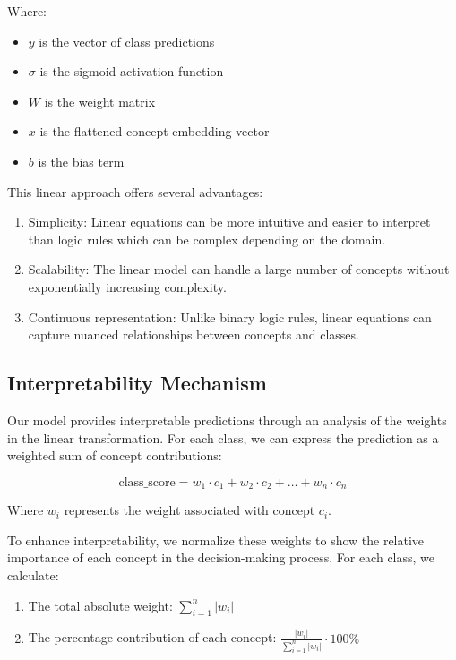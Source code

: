 \documentclass[sigconf, nonacm]{acmart}
\begin{document}
Where:
\begin{itemize}
    \item $y$ is the vector of class predictions
    \item $\sigma$ is the sigmoid activation function
    \item $W$ is the weight matrix
    \item $x$ is the flattened concept embedding vector
    \item $b$ is the bias term
\end{itemize}

This linear approach offers several advantages:

\begin{enumerate}
    \item Simplicity: Linear equations can be more intuitive and easier to interpret than logic rules which can be complex depending on the domain.
    \item Scalability: The linear model can handle a large number of concepts without exponentially increasing complexity.
    \item Continuous representation: Unlike binary logic rules, linear equations can capture nuanced relationships between concepts and classes.
\end{enumerate}

\subsection{Interpretability Mechanism}

Our model provides interpretable predictions through an analysis of the weights in the linear transformation. For each class, we can express the prediction as a weighted sum of concept contributions:

\begin{equation}
    \text{class\_score} = w_1 \cdot c_1 + w_2 \cdot c_2 + \ldots + w_n \cdot c_n
\end{equation}

Where $w_i$ represents the weight associated with concept $c_i$.

To enhance interpretability, we normalize these weights to show the relative importance of each concept in the decision-making process. For each class, we calculate:

\begin{enumerate}
    \item The total absolute weight: $\sum_{i=1}^n |w_i|$
    \item The percentage contribution of each concept: $\frac{|w_i|}{\sum_{i=1}^n |w_i|} \cdot 100\%$
\end{enumerate}
\end{document}
